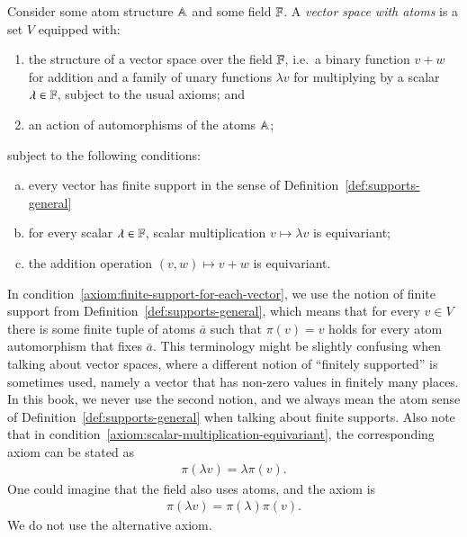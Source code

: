 \begin{definition}
\label{def:vector-space-with-atoms}
    Consider some atom structure $\mathbb A$ and some field $\mathbb F$.  A \emph{vector space with atoms} is a set $V$ equipped with:
    \begin{enumerate}
        \item the structure of a vector space over the field $\mathbb F$, i.e.~a binary function $v+w$ for addition and a family of unary  functions $\lambda v$ for multiplying by a scalar $\lambda \in \mathbb F$, subject to the usual axioms; and 
        \item an action of automorphisms of the atoms $\mathbb A$;
    \end{enumerate}
    subject to the following conditions:
    \begin{enumerate}[(a)]
        \item \label{axiom:finite-support-for-each-vector} every vector has finite support in the sense of Definition~\ref{def:supports-general}
        \item \label{axiom:scalar-multiplication-equivariant} for every scalar $\lambda \in \mathbb F$, scalar multiplication $v \mapsto \lambda v$ is equivariant;
        \item \label{axiom:addition-equivariant} the addition operation $(v,w) \mapsto v+w$ is equivariant.
    \end{enumerate}
\end{definition}

In condition~\ref{axiom:finite-support-for-each-vector}, we use the notion of finite support from Definition~\ref{def:supports-general}, which means that for every $v \in V$ there is some finite tuple of atoms $\bar a$ such that $\pi(v)=v$ holds for every atom automorphism that fixes $\bar a$. This terminology might be slightly confusing when talking about vector spaces, where a different notion of ``finitely supported'' is sometimes used, namely a vector that has non-zero values in finitely many places. In this book, we never use the second notion, and we always mean the atom sense of Definition~\ref{def:supports-general} when talking about finite supports. Also note that in condition~\ref{axiom:scalar-multiplication-equivariant}, the corresponding axiom can be stated as 
\begin{align*}
\pi(\lambda v) = \lambda \pi(v).
\end{align*}
One could imagine that the field also uses atoms, and the  axiom is 
\begin{align*}
\pi(\lambda v) = \pi(\lambda) \pi(v).
\end{align*}
We do not use the alternative axiom. 

